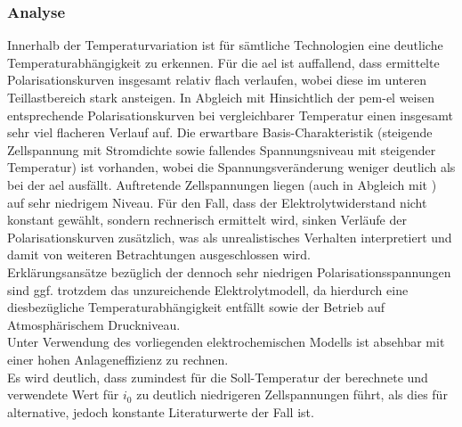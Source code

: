 \documentclass[onecolumn,10pt,titlepage]{article}
\begin{document}
\subsubsection*{Analyse}
Innerhalb der Temperaturvariation ist für sämtliche Technologien eine deutliche Temperaturabhängigkeit zu erkennen. Für die \gls{ael} ist auffallend, dass ermittelte Polarisationskurven insgesamt relativ flach verlaufen, wobei diese im unteren Teillastbereich stark ansteigen. In Abgleich mit \cite{Buttler.2018}
Hinsichtlich der \gls{pem}-\gls{el} weisen entsprechende Polarisationskurven bei vergleichbarer Temperatur einen insgesamt sehr viel flacheren Verlauf auf.
Die erwartbare Basis-Charakteristik (steigende Zellspannung mit Stromdichte sowie fallendes Spannungsniveau mit steigender Temperatur) ist vorhanden, wobei die Spannungsveränderung weniger deutlich als bei der \gls{ael} ausfällt. Auftretende Zellspannungen liegen (auch in Abgleich mit \cite{Buttler.2018}) auf sehr niedrigem Niveau. Für den Fall, dass der Elektrolytwiderstand nicht konstant gewählt, sondern rechnerisch ermittelt wird, sinken Verläufe der Polarisationskurven zusätzlich, was als unrealistisches Verhalten interpretiert und damit von weiteren Betrachtungen ausgeschlossen wird.\\
Erklärungsansätze bezüglich der dennoch sehr niedrigen Polarisationsspannungen sind ggf. trotzdem das unzureichende Elektrolytmodell, da hierdurch eine diesbezügliche Temperaturabhängigkeit entfällt sowie der Betrieb auf Atmosphärischem Druckniveau.\\
Unter Verwendung des vorliegenden elektrochemischen Modells ist absehbar mit einer hohen Anlageneffizienz zu rechnen.\\
Es wird deutlich, dass zumindest für die Soll-Temperatur der berechnete und verwendete Wert für $i_0$ zu deutlich niedrigeren Zellspannungen führt, als dies für alternative, jedoch konstante Literaturwerte der Fall ist.\\
\end{document}

